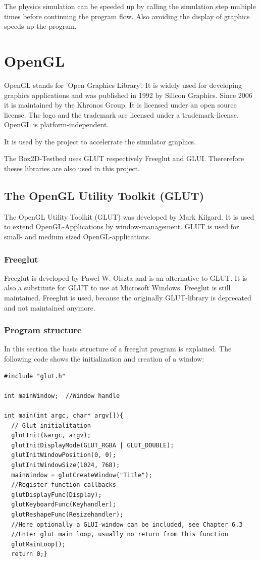 \documentclass[10pt,a4paper,DIV=11]{scrreprt}
\begin{document}
The physics simulation can be speeded up by calling the simulation step multiple times before continuing the program flow. Also avoiding the display of graphics speeds up the program.


\chapter{OpenGL}
OpenGL stands for 'Open Graphics Library'\cite{ogl}. It is widely used for developing graphics applications and was published in 1992 by Silicon Graphics. Since 2006 it is maintained by the Khronos Group. It is licensed under an open source license. The logo and the trademark are licensed under a trademark-license.
OpenGL is platform-independent.


It is used by the project to accelerrate the simulator graphics.

The Box2D-Testbed uses GLUT respectively Freeglut and GLUI. Thererefore theses libraries are also used in this project.


\section{The OpenGL Utility Toolkit (GLUT)}
The OpenGL Utility Toolkit (GLUT) was developed by Mark Kilgard\cite{glut}. It is used to extend OpenGL-Applications by window-management. GLUT is used for small- and medium sized OpenGL-applications.

\subsection{Freeglut}
Freeglut is developed by Pawel W. Olszta\cite{freeglut} and is an alternative to GLUT. It is also a substitute for GLUT to use at Microsoft Windows. Freeglut is still maintained. Freeglut is used, because the originally GLUT-library is deprecated and not maintained anymore.

\subsection{Program structure}
In this section the basic structure of a freeglut program is explained.
The following code shows the initialization and creation of a window:

\begin{lstlisting}[caption={Initialization of a GLUT program},label=lst:glut-init]
#include "glut.h"

int mainWindow;  //Window handle

int main(int argc, char* argv[]){
  // Glut initialitation
  glutInit(&argc, argv);
  glutInitDisplayMode(GLUT_RGBA | GLUT_DOUBLE);
  glutInitWindowPosition(0, 0); 
  glutInitWindowSize(1024, 768);
  mainWindow = glutCreateWindow("Title");
  //Register function callbacks
  glutDisplayFunc(Display);
  glutKeyboardFunc(Keyhandler);
  glutReshapeFunc(Resizehandler);
  //Here optionally a GLUI-window can be included, see Chapter 6.3
  //Enter glut main loop, usually no return from this function
  glutMainLoop(); 
  return 0;}
\end{lstlisting}
\end{document}
